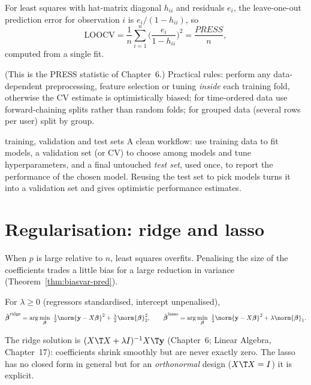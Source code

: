 \begin{theorem}\label{thm:loocv}
For least squares with hat-matrix diagonal $h_{ii}$ and residuals $e_i$, the leave-one-out prediction error for observation $i$ is $e_i/(1-h_{ii})$, so
\[ \mathrm{LOOCV}=\frac1n\sum_{i=1}^n\Big(\frac{e_i}{1-h_{ii}}\Big)^2=\frac{PRESS}n, \]
computed from a single fit.
\end{theorem}

(This is the PRESS statistic of Chapter~6.) Practical rules: perform any data-dependent preprocessing, feature selection or tuning \emph{inside} each training fold, otherwise the CV estimate is optimistically biased; for time-ordered data use forward-chaining splits rather than random folds; for grouped data (several rows per user) split by group.

\begin{interview}{training, validation and test sets}
A clean workflow: use training data to fit models, a validation set (or CV) to choose among models and tune hyperparameters, and a final untouched \emph{test set}, used once, to report the performance of the chosen model. Reusing the test set to pick models turns it into a validation set and gives optimistic performance estimates.
\end{interview}

\section{Regularisation: ridge and lasso}

When $p$ is large relative to $n$, least squares overfits. Penalising the size of the coefficients trades a little bias for a large reduction in variance (Theorem~\ref{thm:biasvar-pred}).

\begin{definition}
For $\lambda\ge0$ (regressors standardised, intercept unpenalised),
\[ \hat{\boldsymbol\beta}^{\mathrm{ridge}}=\arg\min_{\boldsymbol\beta}\ \tfrac12\norm{\mathbf{y}-X\boldsymbol\beta}^2+\tfrac\lambda2\norm{\boldsymbol\beta}_2^2,\qquad\hat{\boldsymbol\beta}^{\mathrm{lasso}}=\arg\min_{\boldsymbol\beta}\ \tfrac12\norm{\mathbf{y}-X\boldsymbol\beta}^2+\lambda\norm{\boldsymbol\beta}_1. \]
\end{definition}

The ridge solution is $(X\T X+\lambda I)^{-1}X\T\mathbf{y}$ (Chapter~6; Linear Algebra, Chapter~17): coefficients shrink smoothly but are never exactly zero. The lasso has no closed form in general but for an \emph{orthonormal} design ($X\T X=I$) it is explicit.

